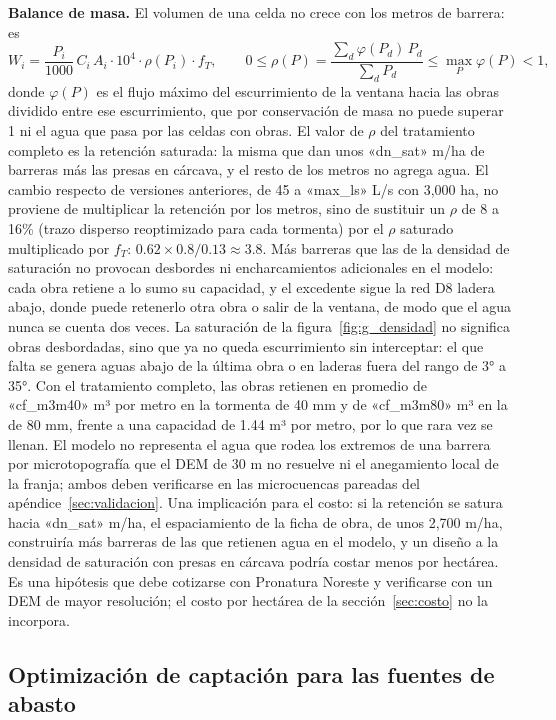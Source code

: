 \textbf{Balance de masa.} El volumen de una celda no crece con los metros de barrera: es
\begin{equation}
W_i = \frac{P_i}{1000}\,C_i\,A_i\cdot 10^4\cdot\rho(P_i)\cdot f_T ,\qquad 0\le \rho(P)=\frac{\sum_d \varphi(P_d)\,P_d}{\sum_d P_d}\le \max_P \varphi(P) < 1,
\end{equation}
donde $\varphi(P)$ es el flujo máximo del escurrimiento de la ventana hacia las obras dividido entre ese escurrimiento, que por conservación de masa no puede superar 1 ni el agua que pasa por las celdas con obras. El valor de $\rho$ del tratamiento completo es la retención saturada: la misma que dan unos «dn_sat» m/ha de barreras más las presas en cárcava, y el resto de los metros no agrega agua. El cambio respecto de versiones anteriores, de 45 a «max_ls» L/s con 3,000 ha, no proviene de multiplicar la retención por los metros, sino de sustituir un $\rho$ de 8 a 16\% (trazo disperso reoptimizado para cada tormenta) por el $\rho$ saturado multiplicado por $f_T$: $0.62\times0.8/0.13\approx3.8$. Más barreras que las de la densidad de saturación no provocan desbordes ni encharcamientos adicionales en el modelo: cada obra retiene a lo sumo su capacidad, y el excedente sigue la red D8 ladera abajo, donde puede retenerlo otra obra o salir de la ventana, de modo que el agua nunca se cuenta dos veces. La saturación de la figura~\ref{fig:g_densidad} no significa obras desbordadas, sino que ya no queda escurrimiento sin interceptar: el que falta se genera aguas abajo de la última obra o en laderas fuera del rango de 3° a 35°. Con el tratamiento completo, las obras retienen en promedio de «cf_m3m40» m³ por metro en la tormenta de 40 mm y de «cf_m3m80» m³ en la de 80 mm, frente a una capacidad de 1.44 m³ por metro, por lo que rara vez se llenan. El modelo no representa el agua que rodea los extremos de una barrera por microtopografía que el DEM de 30 m no resuelve ni el anegamiento local de la franja; ambos deben verificarse en las microcuencas pareadas del apéndice~\ref{sec:validacion}. Una implicación para el costo: si la retención se satura hacia «dn_sat» m/ha, el espaciamiento de la ficha de obra, de unos 2,700 m/ha, construiría más barreras de las que retienen agua en el modelo, y un diseño a la densidad de saturación con presas en cárcava podría costar menos por hectárea. Es una hipótesis que debe cotizarse con Pronatura Noreste y verificarse con un DEM de mayor resolución; el costo por hectárea de la sección~\ref{sec:costo} no la incorpora.

\subsection{Optimización de captación para las fuentes de abasto}\label{sec:optim}

